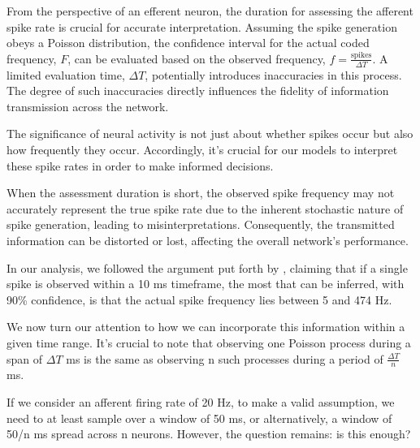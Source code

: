 From the perspective of an efferent neuron, the duration for assessing the afferent spike rate is crucial for accurate interpretation. Assuming the spike generation obeys a Poisson distribution, the confidence interval for the actual coded frequency, $F$, can be evaluated based on the observed frequency, $f = \frac{\text{spikes}}{\Delta T}$. A limited evaluation time, $\Delta T$, potentially introduces inaccuracies in this process. The degree of such inaccuracies directly influences the fidelity of information transmission across the network.

The significance of neural activity is not just about whether spikes occur but also how frequently they occur. Accordingly, it's crucial for our models to interpret these spike rates in order to make informed decisions.

When the assessment duration is short, the observed spike frequency may not accurately represent the true spike rate due to the inherent stochastic nature of spike generation, leading to misinterpretations. Consequently, the transmitted information can be distorted or lost, affecting the overall network's performance.

In our analysis, we followed the argument put forth by \cite{gautrais1998rate}, claiming that if a single spike is observed within a 10 ms timeframe, the most that can be inferred, with 90\% confidence, is that the actual spike frequency lies between 5 and 474 Hz.

We now turn our attention to how we can incorporate this information within a given time range. It's crucial to note that observing one Poisson process during a span of $\Delta T$ ms is the same as observing n such processes during a period of $\frac{\Delta T}{n}$ ms.

If we consider an afferent firing rate of 20 Hz, to make a valid assumption, we need to at least sample over a window of 50 ms, or alternatively, a window of 50/n ms spread across n neurons. However, the question remains: is this enough?